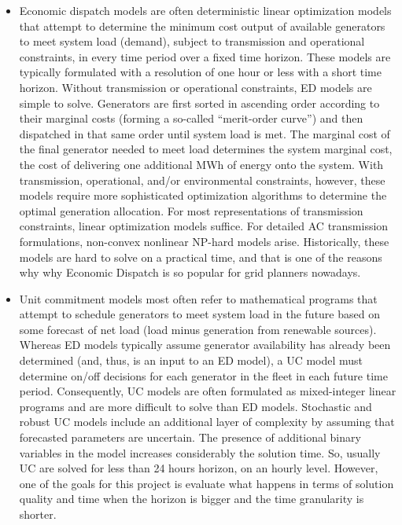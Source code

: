 \documentclass[12pt,LUDisStyle,twosided]{book}
\begin{document}
\begin{itemize}
\item Economic dispatch models are often deterministic linear optimization models that attempt to determine the minimum cost output of available generators to meet system load (demand), subject to transmission and operational constraints, in every time period over a fixed time horizon.  These models are typically formulated with a resolution of one hour or less with a short time horizon. Without transmission or operational constraints, ED models are simple to solve. Generators are first sorted in ascending order according to their marginal costs (forming a so-called ``merit-order curve'') and then dispatched in that same order until system load is met. The marginal cost of the final generator needed to meet load determines the system marginal cost, the cost of delivering one additional MWh of energy onto the system.  With transmission, operational, and/or environmental constraints, however, these models require more sophisticated optimization algorithms to determine the optimal generation allocation.  For most representations of transmission constraints, linear optimization models suffice.  For detailed AC transmission formulations, non-convex nonlinear NP-hard models arise. Historically, these models are hard to solve on a practical time, and that is one of the reasons why why Economic Dispatch is so popular for grid planners nowadays.

\item Unit commitment models most often refer to mathematical programs that attempt to schedule generators to meet system load in the future based on some forecast of net load (load minus generation from renewable sources).  Whereas ED models typically assume generator availability has already been determined (and, thus, is an input to an ED model), a UC model must determine on/off decisions for each generator in the fleet in each future time period.  Consequently, UC models are often formulated as mixed-integer linear programs and are more difficult to solve than ED models.  Stochastic and robust UC models include an additional layer of complexity by assuming that forecasted parameters are uncertain. The presence of additional binary variables in the model increases considerably the solution time. So, usually UC are solved for less than 24 hours horizon, on an hourly level. However, one of the goals for this project is evaluate what happens in terms of solution quality and time when the horizon is bigger and the time granularity is shorter.

\end{itemize}
\end{document}
